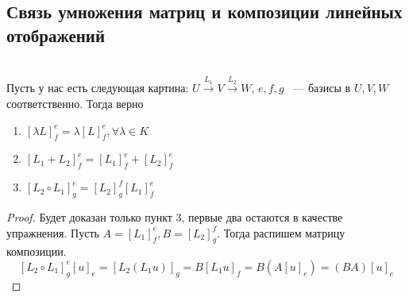 \subsection{Связь умножения матриц и композиции линейных отображений}
\begin{statement}\leavevmode\\
    Пусть у нас есть следующая картина: $U\xrightarrow{L_1} V \xrightarrow{L_2} W$, $e, f, g$ 
    ~--- базисы в $U, V, W$ соответственно. Тогда верно
    \begin{enumerate}
        \item $[\lambda L]^e_f=\lambda[L]^e_f, \forall \lambda\in K$ 
        \item $[L_1 + L_2]^e_f = [L_1]^e_f + [L_2]^e_f$ 
        \item $[L_2\circ L_1]^e_g = [L_2]^f_g[L_1]^e_f$
    \end{enumerate}
\end{statement}
\begin{proof}
    Будет доказан только пункт 3, первые два остаются в качестве упражнения.
    Пусть $A = [L_1]^e_f, B = [L_2]^f_g$. Тогда распишем матрицу композиции.
    \[
        [L_2\circ L_1]^e_g[u]_e= [L_2(L_1u)]_g = B[L_1u]_f = B(A[u]_e) = (BA)[u]_e
    \]
\end{proof}
